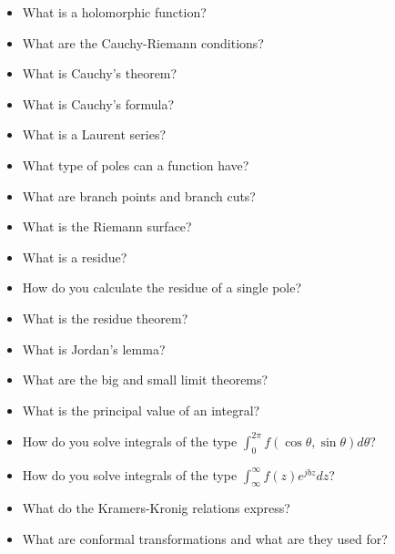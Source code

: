\begin{itemize}
\item What is a holomorphic function?
\item What are the Cauchy-Riemann conditions?
\item What is Cauchy's theorem?
\item What is Cauchy's formula?
\item What is a Laurent series?
\item What type of poles can a function have?
\item What are branch points and branch cuts?
\item What is the Riemann surface?
\item What is a residue?
\item How do you calculate the residue of a single pole?
\item What is the residue theorem?
\item What is Jordan's lemma?
\item What are the big and small limit theorems?
\item What is the principal value of an integral?
\item How do you solve integrals of the type $\int_0^{2 \pi} f(\cos \theta, \sin \theta) d \theta$?
\item How do you solve integrals of the type  $\int_\infty^{\infty} f(z) e^{jbz} dz$?
\item What do the Kramers-Kronig relations express?
\item What are conformal transformations and what are they used for?
\end{itemize}

